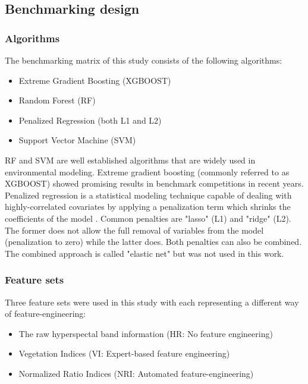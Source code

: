 \documentclass[letterpaper, journal]{IEEEtran}
\begin{document}
\subsection{Benchmarking design}


\subsubsection{Algorithms}

\noindent The benchmarking matrix of this study consists of the following algorithms:

\begin{itemize}
	\item  Extreme Gradient Boosting (XGBOOST)
	\item  Random Forest (RF)
	\item  Penalized Regression (both L1 and L2)
	\item  Support Vector Machine (SVM)
\end{itemize}


\noindent \ac{RF} and {SVM} are well established algorithms that are widely used in environmental modeling.
Extreme gradient boosting (commonly referred to as \ac{XGBOOST}) showed promising results in benchmark competitions in recent years.
Penalized regression is a statistical modeling technique capable of dealing with highly-correlated covariates by applying a penalization term which shrinks the coefficients of the model \cite{hastie2001}.
Common penalties are "lasso" (L1) and "ridge" (L2).
The former does not allow the full removal of variables from the model (penalization to zero) while the latter does.
Both penalties can also be combined.
The combined approach is called "elastic net" but was not used in this work.

\subsubsection{Feature sets}

\noindent Three feature sets were used in this study with each representing a different way of feature-engineering:


\begin{itemize}
	\item The raw hyperspectal band information (HR: No feature engineering)
	\item Vegetation Indices (\ac{VI}: Expert-based feature engineering)
	\item Normalized Ratio Indices (\ac{NRI}: Automated feature-engineering)
\end{itemize}
\end{document}

